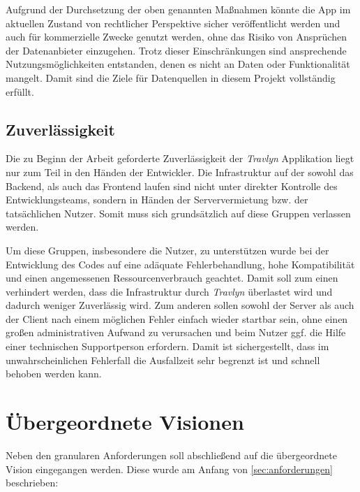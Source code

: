 	\vspace{0.25cm}
	
	Aufgrund der Durchsetzung der oben genannten Maßnahmen könnte die App im aktuellen Zustand von rechtlicher Perspektive sicher veröffentlicht werden und auch für kommerzielle Zwecke genutzt werden, ohne das Risiko von Ansprüchen der Datenanbieter einzugehen. Trotz dieser Einschränkungen sind ansprechende Nutzungsmöglichkeiten entstanden, denen es nicht an Daten oder Funktionalität mangelt. Damit sind die Ziele für Datenquellen in diesem Projekt vollständig erfüllt.
	
	\subsection{Zuverlässigkeit}
	
	Die zu Beginn der Arbeit geforderte Zuverlässigkeit der \textit{Travlyn} Applikation liegt nur zum Teil in den Händen der Entwickler. Die Infrastruktur auf der sowohl das Backend, als auch das Frontend laufen sind nicht unter direkter Kontrolle des Entwicklungsteams, sondern in Händen der Serververmietung bzw. der tatsächlichen Nutzer. Somit muss sich grundsätzlich auf diese Gruppen verlassen werden.
	
	\vspace{0.25cm}
	
	Um diese Gruppen, insbesondere die Nutzer, zu unterstützen wurde bei der Entwicklung des Codes auf eine adäquate Fehlerbehandlung, hohe Kompatibilität und einen angemessenen Ressourcenverbrauch geachtet. Damit soll zum einen verhindert werden, dass die Infrastruktur durch \textit{Travlyn} überlastet wird und dadurch weniger Zuverlässig wird. Zum anderen sollen sowohl der Server als auch der Client nach einem möglichen Fehler einfach wieder startbar sein, ohne einen großen administrativen Aufwand zu verursachen und beim Nutzer ggf. die Hilfe einer technischen Supportperson erfordern. Damit ist sichergestellt, dass im unwahrscheinlichen Fehlerfall die Ausfallzeit sehr begrenzt ist und schnell behoben werden kann.  
	
	\section{Übergeordnete Visionen}
	
	Neben den granularen Anforderungen soll abschließend auf die übergeordnete Vision eingegangen werden. Diese wurde am Anfang von \autoref{sec:anforderungen} beschrieben:
	
